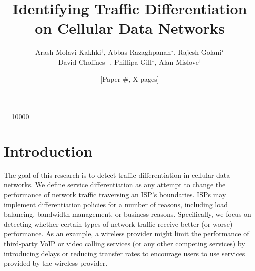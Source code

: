 \documentclass[letterpaper]{sig-alternate-2013}
\title{Identifying Traffic Differentiation on Cellular Data Networks}
\author{
	\alignauthor Arash Molavi Kakhki$^\ddagger$, Abbas Razaghpanah$^\star$, Rajesh Golani$^\star$\\David Choffnes$^\ddagger$ , Phillipa Gill$^\star$, Alan Mislove$^\ddagger$ \\
	\affaddr{$\ddagger$Northeastern University, $\star$ Stony Brook University}
}
\author{[Paper \#, X pages]}
\begin{document}

\widowpenalty = 10000

\maketitle

\section{Introduction}


The goal of this research is to detect traffic differentiation in cellular data networks. We define service differentiation as any attempt to change the performance of network traffic traversing an ISP's boundaries. ISPs may implement differentiation policies for a number of reasons, including load balancing, bandwidth management, or business reasons. Specifically, we focus on detecting whether certain types of network traffic receive better (or worse) performance. As an example, a wireless provider might limit the performance of third-party VoIP or video calling services (or any other competing services) by introducing delays or reducing transfer rates to encourage users to use services provided by the wireless provider.
\end{document}
